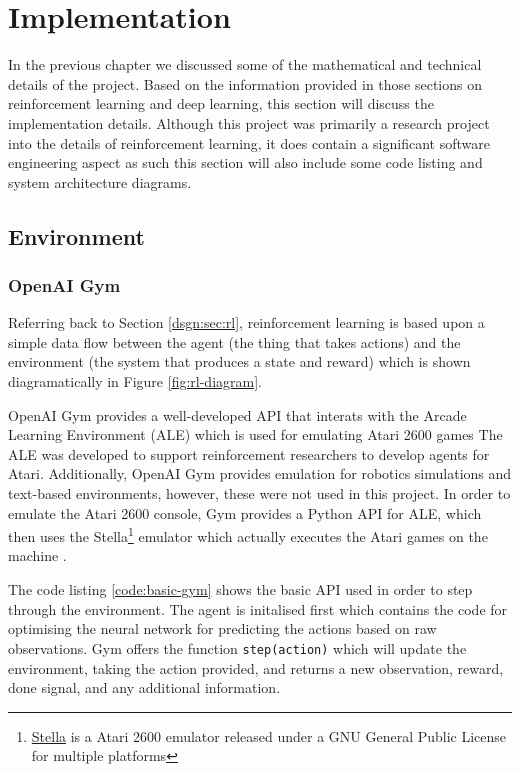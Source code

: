 \chapter{Implementation}
In the previous chapter we discussed some of the mathematical and technical details of the project. Based on the information provided in those sections on reinforcement learning and deep learning, this section will discuss the implementation details. Although this project was primarily a research project into the details of reinforcement learning, it does contain a significant software engineering aspect as such this section will also include some code listing and system architecture diagrams.

\section{Environment}
\subsection{OpenAI Gym}
Referring back to Section \ref{dsgn:sec:rl}, reinforcement learning is based upon a simple data flow between the agent (the thing that takes actions) and the environment (the system that produces a state and reward) which is shown diagramatically in Figure \ref{fig:rl-diagram}.

OpenAI Gym provides a well-developed API that interats with the Arcade Learning Environment (ALE) which is used for emulating Atari 2600 games The ALE was developed to support reinforcement researchers to develop agents for Atari\cite{bellemare13arcade}\cite{machado18arcade}. Additionally, OpenAI Gym provides emulation for robotics simulations and text-based environments, however, these were not used in this project. In order to emulate the Atari 2600 console, Gym provides a Python API for ALE, which then uses the Stella\footnote{\href{https://stella-emu.github.io/}{Stella} is a Atari 2600 emulator released under a GNU General Public License for multiple platforms} emulator which actually executes the Atari games on the machine \cite{brockman2016openai}.

The code listing \ref{code:basic-gym} shows the basic API used in order to step through the environment. The agent is initalised first which contains the code for optimising the neural network for predicting the actions based on raw observations. Gym offers the function \texttt{step(action)} which will update the environment, taking the action provided, and returns a new observation, reward, done signal, and any additional information.

